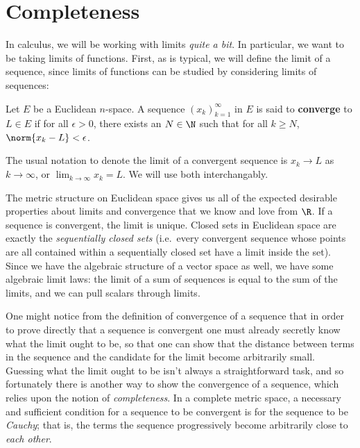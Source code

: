 \section{Completeness}
In calculus, we will be working with limits \emph{quite a bit}. In particular, we want to be taking limits of functions. First, as is typical, we will define the limit of a sequence, since limits of functions can be studied by considering limits of sequences:
\begin{definition}
  Let \( E \) be a Euclidean \( n \)-space. A sequence \( (x_k)_{k=1}^\infty \) in \( E \) is said to \textbf{converge} to \( L\in E \) if for all \( \epsilon>0 \), there exists an \( N\in\N \) such that for all \( k\geq N \), \( \norm{x_k-L}<\epsilon \).
\end{definition}

The usual notation to denote the limit of a convergent sequence is \( x_k\to L \) as \( k\to\infty \), or \( \lim_{k\to\infty}x_k=L \). We will use both interchangably.

\vspace{3mm}

The metric structure on Euclidean space gives us all of the expected desirable properties about limits and convergence that we know and love from \( \R \). If a sequence is convergent, the limit is unique. Closed sets in Euclidean space are exactly the \emph{sequentially closed sets} (i.e.\ every convergent sequence whose points are all contained within a sequentially closed set have a limit inside the set). Since we have the algebraic structure of a vector space as well, we have some algebraic limit laws: the limit of a sum of sequences is equal to the sum of the limits, and we can pull scalars through limits.

\vspace{3mm}

One might notice from the definition of convergence of a sequence that in order to prove directly that a sequence is convergent one must already secretly know what the limit ought to be, so that one can show that the distance between terms in the sequence and the candidate for the limit become arbitrarily small. Guessing what the limit ought to be isn't always a straightforward task, and so fortunately there is another way to show the convergence of a sequence, which relies upon the notion of \emph{completeness}. In a complete metric space, a necessary and sufficient condition for a sequence to be convergent is for the sequence to be \emph{Cauchy}; that is, the terms the sequence progressively become arbitrarily close to \emph{each other}.

